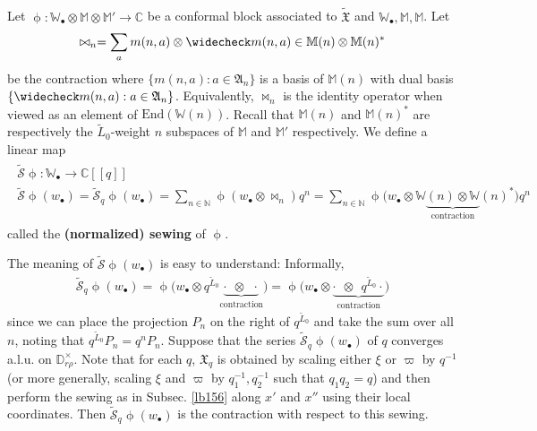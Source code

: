 \documentclass[11pt,b5paper,notitlepage]{article}
\theoremstyle{definition}
\theoremstyle{plain}
\newcommand{\fk}{\mathfrak}
\newcommand{\mc}{\mathcal}
\newcommand{\wtd}{\widetilde}
\newcommand{\wch}{\widecheck}
\newcommand{\End}{\mathrm{End}} %
\newcommand{\blt}{\bullet}
\newcommand{\Wbb}{\mathbb W}
\newcommand{\Mbb}{\mathbb M}
\newcommand{\Cbb}{\mathbb C}
\newcommand{\Nbb}{\mathbb N}
\newcommand{\Dbb}{\mathbb D}
\numberwithin{equation}{section}
\begin{document}
\subsection{}


Let $\upphi:\Wbb_\blt\otimes\Mbb\otimes\Mbb'\rightarrow\Cbb$ be a conformal block associated to $\wtd{\fk X}$ and $\Wbb_\blt,\Mbb,\Mbb$. Let 
\begin{align}
\bowtie_n=\sum_a m(n,a)\otimes \wch m(n,a)\in \Mbb(n)\otimes\Mbb(n)^*
\end{align}
be the contraction where $\{m(n,a):a\in\fk A_n\}$ is a basis of $\Mbb(n)$ with dual basis $\{\wch m(n,a):a\in\fk A_n\}$. Equivalently, $\bowtie_n$ is the identity operator when viewed as an element of $\End(\Wbb(n))$. Recall that $\Mbb(n)$ and $\Mbb(n)^*$ are respectively the $\wtd L_0$-weight $n$ subspaces of $\Mbb$ and $\Mbb'$ respectively. We define a linear map \index{S@$\wtd{\mc S}\upphi$, the normalized sewing}
\begin{gather}
\begin{gathered}
\wtd{\mc S}\upphi:\Wbb_\blt\rightarrow\Cbb[[q]]\\
\wtd{\mc S}\upphi(w_\blt)=\wtd{\mc S}_q\upphi(w_\blt)=\sum_{n\in\Nbb}\upphi(w_\blt\otimes \bowtie_n)q^n=\sum_{n\in\Nbb}\upphi\big(w_\blt\otimes \Wbb\underbrace{(n)\otimes\Wbb}_{\text{contraction}}(n)^*\big)q^n
\end{gathered}
\end{gather}
called the \textbf{(normalized) sewing} of $\upphi$. 

The meaning of $\wtd{\mc S}\upphi(w_\blt)$ is easy to understand: Informally, 
\begin{align}
\wtd{\mc S}_q\upphi(w_\blt)=\upphi\big(w_\blt\otimes q^{\wtd L_0}\underbrace{\cdot~~\otimes~~\cdot}_{\text{contraction}}\big)=\upphi\big(w_\blt\otimes \underbrace{\cdot~~\otimes~~q^{\wtd L_0}\cdot}_{\text{contraction}}\big)
\end{align}
since we can place the projection $P_n$ on the right of $q^{\wtd L_0}$ and take the sum over all $n$, noting that $q^{\wtd L_0}P_n=q^nP_n$. Suppose that the series $\wtd{\mc S}_q\upphi(w_\blt)$ of $q$ converges a.l.u. on $\Dbb_{r\rho}^\times$. Note that for each  $q$, $\fk X_q$ is obtained by scaling either $\xi$ or $\varpi$ by $q^{-1}$ (or more generally, scaling $\xi$ and $\varpi$ by $q_1^{-1},q_2^{-1}$ such that $q_1q_2=q$) and then perform the sewing as in Subsec. \ref{lb156} along $x'$ and $x''$ using their local coordinates. Then $\wtd{\mc S}_q\upphi(w_\blt)$ is the contraction with respect to this sewing.
\end{document}
